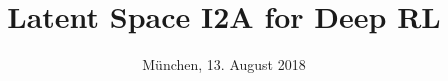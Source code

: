 %
% 
% 
%




\newcommand\tab[1][0.5cm]{\hspace*{#1}}
\DeclareMathOperator{\EX}{\mathbb{E}}%
\usepackage{media9}

\renewcommand{\PersonTitel}{}
\newcommand{\Datum}{\today}

\renewcommand{\PraesentationFusszeileZusatz}{}

\title{Latent Space I2A for Deep RL}
\author{\PersonTitel{} \PersonVorname{} \PersonNachname}
\institute[]{\UniversitaetName}
\date[\Datum]{München, 13. August 2018}
\subject{I2A}




\PraesentationMasterStandard

\PraesentationTitelseite %


